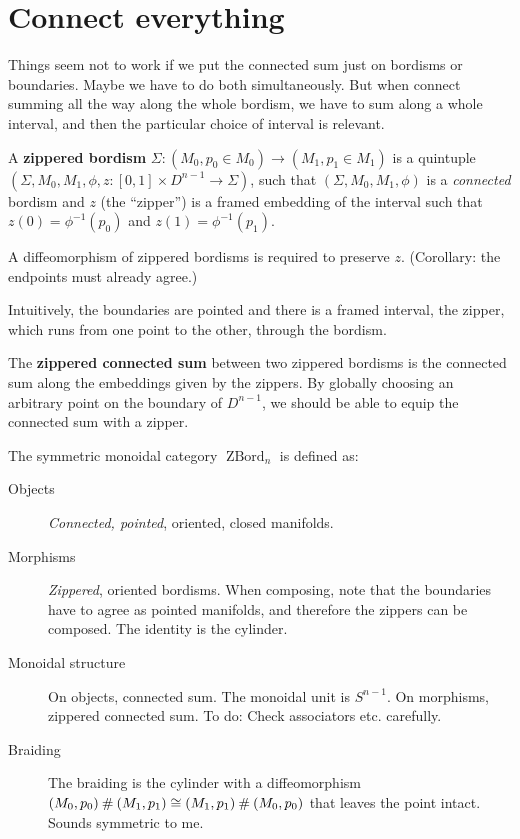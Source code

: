 \documentclass[a4paper]{article}
\begin{document}
\section{Connect everything}
\label{sec:connect everything}

Things seem not to work if we put the connected sum just on bordisms or boundaries.
Maybe we have to do both simultaneously.
But when connect summing all the way along the whole bordism,
we have to sum along a whole interval,
and then the particular choice of interval is relevant.

\begin{definition}
	A \textbf{zippered bordism} $\Sigma\colon (M_0, p_0 \in M_0) \to (M_1, p_1 \in M_1)$ is a quintuple $(\Sigma, M_0, M_1, \phi, z\colon [0,1] \times D^{n-1} \to \Sigma)$,
	such that $(\Sigma, M_0, M_1, \phi)$ is a \emph{connected} bordism and $z$ (the ``zipper'') is a framed embedding of the interval such that $z(0) = \phi^{-1}(p_0)$ and $z(1) = \phi^{-1}(p_1)$.
	
	A diffeomorphism of zippered bordisms is required to preserve $z$.
	(Corollary: the endpoints must already agree.)
\end{definition}
Intuitively, the boundaries are pointed and there is a framed interval,
the zipper,
which runs from one point to the other, through the bordism.
\begin{definition}
	The \textbf{zippered connected sum} between two zippered bordisms is the connected sum along the embeddings given by the zippers.
	By globally choosing an arbitrary point on the boundary of $D^{n-1}$,
	we should be able to equip the connected sum with a zipper.
\end{definition}

\begin{definition}
	The symmetric monoidal category $\operatorname{ZBord}_n$ is defined as:
	\begin{description}
		\item[Objects]
			\emph{Connected, pointed}, oriented, closed manifolds.
		\item[Morphisms]
			\emph{Zippered}, oriented bordisms.
			When composing, note that the boundaries have to agree as pointed manifolds,
			and therefore the zippers can be composed.
			The identity is the cylinder.
		\item[Monoidal structure]
			On objects, connected sum.
			The monoidal unit is $S^{n-1}$.
			On morphisms, zippered connected sum.
			To do: Check associators etc. carefully.
		\item[Braiding]
			The braiding is the cylinder with a diffeomorphism $(M_0, p_0) \mathbin{\#} (M_1, p_1) \cong (M_1, p_1) \mathbin{\#} (M_0, p_0)$ that leaves the point intact.
			Sounds symmetric to me.
	\end{description}
\end{definition}
\end{document}
